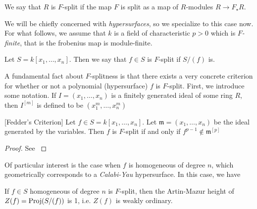 \begin{defn}
	We say that \(R\) is \(F\)-split if the map \(F\) is
	split as a map of 
	\(R\)-modules \(R \xrightarrow{} F_{\star}R\).
\end{defn}

We will be chiefly concerned with \textit{hypersurfaces},
so we specialize to this case now.
For what follows, we assume that \(k\) is a field
of characteristic \(p > 0\) which is 
\textit{\(F\)-finite}, that is the frobenius
map is module-finite.

\begin{defn}
	Let \(S = k[x_{1}, \ldots, x_{n}]\).
	Then we say that \(f \in S\) is \(F\)-split if 
	\(S / (f)\) is.
\end{defn}

A fundamental fact about \(F\)-splitness is that there
exists a very concrete criterion for whether or 
not a polynomial (hypersurface) \(f\) is \(F\)-split.
First, we introduce some notation.
If \(I = (x_{1}, \ldots, x_{n})\) is a finitely generated 
ideal of some ring \(R\), 
then \(I^{[m]}\)
is defined to be \((x_{1}^{m}, \ldots, x_{n}^{m})\)

\begin{thm}
    \label{thm:fedder:criterion}
	[Fedder's Criterion]
	Let \(f \in S = k[x_{1}, \ldots, x_{n}]\).
	Let \(\mathfrak{m} = (x_{1}, \ldots, x_{n})\) 
	be the ideal generated by the variables.
	Then \(f\) is \(F\)-split if and only if 
	\(f^{p-1} \notin \mathfrak{m}^{[p]}\)
\end{thm}

\begin{proof}
	See \cite[Theorem~2.5]{ma-polstra-2021-F-sing-comm-alg}
\end{proof}


Of particular interest is the case when \(f\) is 
homogeneous of degree \(n\), which geometrically
corresponds to a \textit{Calabi-Yau} hypersurface.
In this case, we have

\begin{thm}
	\label{thm:fsplit:ordinary}
	If \(f \in S\) 
	homogeneous of degree \(n\) 
	is \(F\)-split,
	then the Artin-Mazur height 
	of \(Z(f) = \operatorname{Proj} (S / (f))\) 
	is 1, i.e. \(Z(f)\) is weakly ordinary.
\end{thm}

